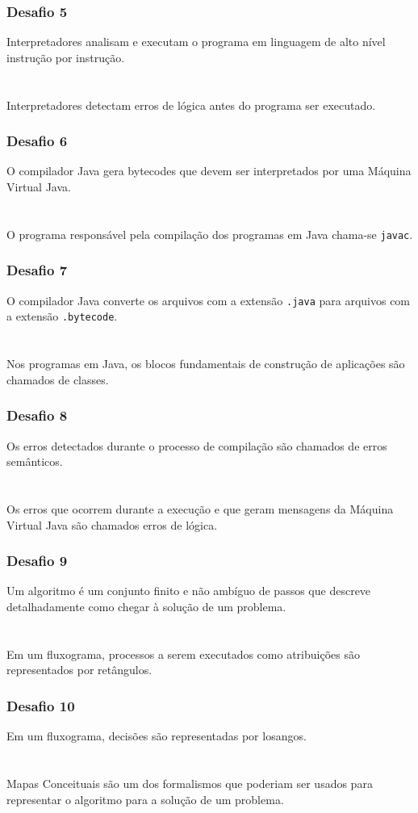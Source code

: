 \documentclass[aspectratio=169]{beamer}
\begin{document}
\begin{frame}\frametitle{Desafio 5}
Interpretadores analisam e executam o programa em linguagem de alto nível instrução por instrução.\\
~\\
~\\
Interpretadores detectam erros de lógica antes do programa ser executado.
\end{frame}

\begin{frame}\frametitle{Desafio 6}
O compilador Java gera bytecodes que devem ser interpretados por uma Máquina Virtual Java.\\
~\\
~\\
O programa responsável pela compilação dos programas em Java chama-se \texttt{javac}.
\end{frame}

\begin{frame}\frametitle{Desafio 7}
O compilador Java converte os arquivos com a extensão \texttt{.java} para arquivos com a extensão \texttt{.bytecode}.\\
~\\
~\\
Nos programas em Java, os blocos fundamentais de construção de aplicações são chamados de classes.
\end{frame}

\begin{frame}\frametitle{Desafio 8}
Os erros detectados durante o processo de compilação são chamados de erros semânticos.\\
~\\
~\\
Os erros que ocorrem durante a execução e que geram mensagens da Máquina Virtual Java são chamados erros de lógica.
\end{frame}

\begin{frame}\frametitle{Desafio 9}
Um algoritmo é um conjunto finito e não ambíguo de passos que descreve detalhadamente como chegar à solução de um problema.\\
~\\
~\\
Em um fluxograma, processos a serem executados como atribuições são representados por retângulos.
\end{frame}

\begin{frame}\frametitle{Desafio 10}
Em um fluxograma, decisões são representadas por losangos.\\
~\\
~\\
Mapas Conceituais são um dos formalismos que poderiam ser usados para representar o algoritmo para a solução de um problema.
\end{frame}

\end{document}
